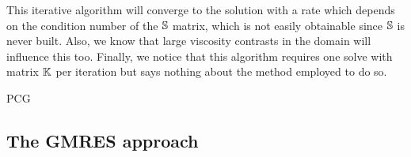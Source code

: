 This iterative algorithm will converge to the solution with a rate which depends on 
the condition number of the ${\mathbb{S}}$ matrix, which is not easily obtainable since 
${\mathbb{S}}$ is never built. Also, we know that large viscosity contrasts in the domain 
will influence this too. Finally, we notice that this algorithm requires one solve
with matrix ${\mathbb{K}}$ per iteration but says nothing about the method employed to do so.



{\color{red} PCG}










\subsection{The GMRES approach}
